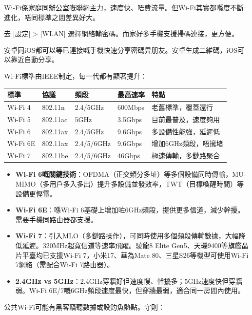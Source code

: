 Wi-Fi係家庭同辦公室嘅聯網主力，速度快、唔費流量。但Wi-Fi其實都喺度不斷進化，唔同標準之間差異好大。


去 [設定] > [WLAN] 選擇網絡輸密碼。而家好多手機支援掃碼連接，更方便。


安卓同iOS都可以等已連接嘅手機快速分享密碼畀朋友。安卓生成二維碼，iOS可以靠近自動分享。


Wi-Fi標準由IEEE制定，每一代都有顯著提升：

\begin{center}
\begin{tabularx}{\linewidth}{|X|X|X|X|X|}
\hline
\textbf{標準} & \textbf{協議} & \textbf{頻段} & \textbf{最高速率} & \textbf{特點} \tabularnewline
\hline
Wi-Fi 4 & 802.11n & 2.4/5GHz & 600Mbps & 老舊標準，覆蓋還行 \tabularnewline
Wi-Fi 5 & 802.11ac & 5GHz & 3.5Gbps & 目前最普及，速度夠用 \tabularnewline
Wi-Fi 6 & 802.11ax & 2.4/5GHz & 9.6Gbps & 多設備性能強，延遲低 \tabularnewline
Wi-Fi 6E & 802.11ax & 2.4/5/6GHz & 9.6Gbps & 增加6GHz頻段，唔擁堵 \tabularnewline
Wi-Fi 7 & 802.11be & 2.4/5/6GHz & 46Gbps & 極速傳輸，多鏈路聚合 \tabularnewline
\hline
\end{tabularx}
\end{center}

\begin{itemize}
  \item \textbf{Wi-Fi 6嘅關鍵技術}：OFDMA（正交頻分多址）等多個設備同時傳輸，MU-MIMO（多用戶多入多出）提升多設備並發效率，TWT（目標喚醒時間）等設備更慳電。
  \item \textbf{Wi-Fi 6E}：喺Wi-Fi 6基礎上增加咗6GHz頻段，提供更多信道，減少幹擾。需要手機同路由器都支援。
  \item \textbf{Wi-Fi 7}：引入MLO（多鏈路操作），可同時使用多個頻段傳輸數據，大幅降低延遲。320MHz超寬信道等速率飛躍。驍龍8 Elite Gen5、天璣9400等旗艦晶片平臺均已支援Wi-Fi 7，小米17、華為Mate 80、三星S26等機型可使用Wi-Fi 7網絡（需配合Wi-Fi 7路由器）。
  \item \textbf{2.4GHz vs 5GHz}：2.4GHz穿牆好但速度慢、幹擾多；5GHz速度快但穿牆弱。Wi-Fi 6E/7嘅6GHz頻段速度最快，但穿牆最弱，適合同一房間內使用。
\end{itemize}


公共Wi-Fi可能有黑客竊聽數據或設釣魚熱點。守則：

